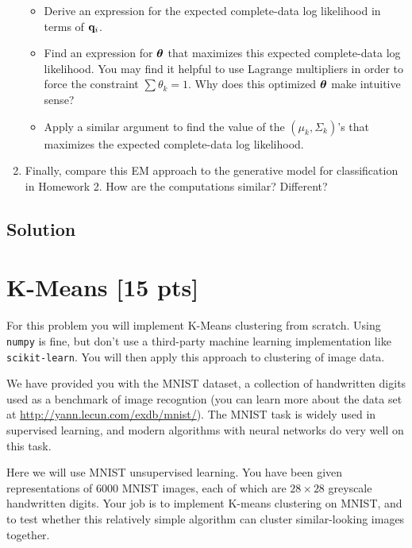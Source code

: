 \documentclass[submit]{harvardml}
\begin{document}
\begin{problem}
\begin{enumerate}
\begin{itemize}
    \item Derive an expression for the expected complete-data log likelihood in terms of $\mathbf{q}_i$.
    \item Find an expression for $\boldsymbol{\theta}$ that maximizes this expected complete-data log likelihood. You may find it helpful to use Lagrange multipliers in order to force the constraint $\sum \theta_k = 1$. Why does this optimized $\boldsymbol{\theta}$ make intuitive sense?
    \item Apply a similar argument to find the value of the $(\mu_k,\Sigma_k)$'s that maximizes the expected complete-data log likelihood. 
\end{itemize}

\item Finally, compare this EM approach to the generative model for
classification in Homework 2.  How are the computations similar?
Different? 

\end{enumerate}


  
\end{problem}

\subsection*{Solution}


\newpage

\section*{K-Means [15 pts]} %

For this problem you will implement  K-Means clustering from scratch. Using \texttt{numpy} is fine, but don't use a
third-party machine learning implementation like \texttt{scikit-learn}. You will then apply this approach to clustering of image data.  



We have provided you with the MNIST dataset, a collection of handwritten digits used as a benchmark of image recogntion (you  can
learn more about the data set at  \url{http://yann.lecun.com/exdb/mnist/}). The MNIST task
is widely used in supervised learning, and modern algorithms with neural
networks do very well on this task. 

Here we will use MNIST unsupervised learning. You have been given
representations of 6000 MNIST images, each of which are $28\times28$
greyscale handwritten digits. Your job is to implement K-means
clustering on MNIST, and to test whether this relatively simple algorithm can
cluster similar-looking images together.
\end{document}
